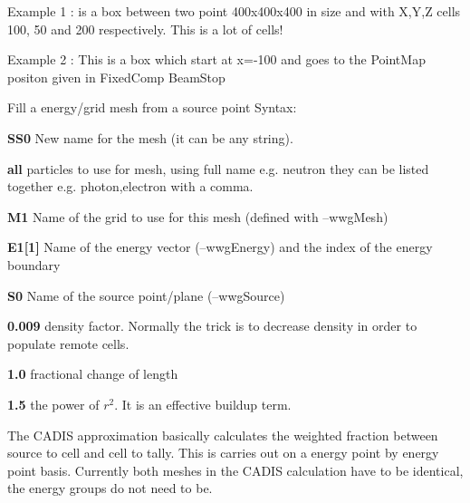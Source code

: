 \begin{description}
  \begin{description}
  \item Example 1 : is a box between two point 400x400x400 in size and with
    X,Y,Z cells 100, 50 and 200 respectively. This is a lot of cells!
  \item Example 2 : This is a box which start at x=-100 and goes to the
    PointMap positon given in FixedComp BeamStop

  \item[--wwgCreate] Fill a energy/grid mesh  from a source point
    Syntax:
    \begin{description}
    \item {\bf SS0} New name for the mesh (it can be any string).
    \item {\bf all} particles to use for mesh, using full name e.g. neutron
      they can be listed together e.g. photon,electron with a comma.
    \item {\bf M1} Name of the grid to use for this mesh (defined with --wwgMesh)
    \item {\bf E1[1]} Name of the energy vector (--wwgEnergy)
      and the index of the energy boundary
    \item {\bf S0} Name of the source point/plane (--wwgSource)
    \item {\bf 0.009} density factor. Normally the trick is to decrease density in order to populate remote cells.
    \item {\bf 1.0} fractional change of length
    \item {\bf 1.5} the power of $r^2$. It is an effective buildup term.
    \end{description}

  \item[--wwgCADIS] The CADIS approximation basically calculates the weighted
    fraction between source to cell and cell to tally. This is carries out on
    a energy point by energy point basis. Currently both meshes in the CADIS
    calculation have to be identical, the energy groups do not need to be.
    

\end{description}
\end{description}
